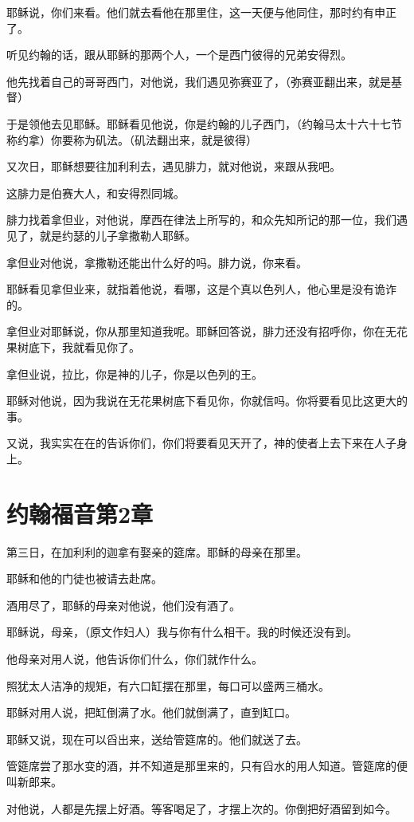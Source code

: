 \documentclass[12pt,oneside]{book}
\begin{document}
耶稣说，你们来看。他们就去看他在那里住，这一天便与他同住，那时约有申正了。

听见约翰的话，跟从耶稣的那两个人，一个是西门彼得的兄弟安得烈。

他先找着自己的哥哥西门，对他说，我们遇见弥赛亚了，（弥赛亚翻出来，就是基督）

于是领他去见耶稣。耶稣看见他说，你是约翰的儿子西门，（约翰马太十六十七节称约拿）你要称为矶法。（矶法翻出来，就是彼得）

又次日，耶稣想要往加利利去，遇见腓力，就对他说，来跟从我吧。

这腓力是伯赛大人，和安得烈同城。

腓力找着拿但业，对他说，摩西在律法上所写的，和众先知所记的那一位，我们遇见了，就是约瑟的儿子拿撒勒人耶稣。

拿但业对他说，拿撒勒还能出什么好的吗。腓力说，你来看。

耶稣看见拿但业来，就指着他说，看哪，这是个真以色列人，他心里是没有诡诈的。

拿但业对耶稣说，你从那里知道我呢。耶稣回答说，腓力还没有招呼你，你在无花果树底下，我就看见你了。

拿但业说，拉比，你是神的儿子，你是以色列的王。

耶稣对他说，因为我说在无花果树底下看见你，你就信吗。你将要看见比这更大的事。

又说，我实实在在的告诉你们，你们将要看见天开了，神的使者上去下来在人子身上。

\chapter{约翰福音第2章}
第三日，在加利利的迦拿有娶亲的筵席。耶稣的母亲在那里。

耶稣和他的门徒也被请去赴席。

酒用尽了，耶稣的母亲对他说，他们没有酒了。

耶稣说，母亲，（原文作妇人）我与你有什么相干。我的时候还没有到。

他母亲对用人说，他告诉你们什么，你们就作什么。

照犹太人洁净的规矩，有六口缸摆在那里，每口可以盛两三桶水。

耶稣对用人说，把缸倒满了水。他们就倒满了，直到缸口。

耶稣又说，现在可以舀出来，送给管筵席的。他们就送了去。

管筵席尝了那水变的酒，并不知道是那里来的，只有舀水的用人知道。管筵席的便叫新郎来。

对他说，人都是先摆上好酒。等客喝足了，才摆上次的。你倒把好酒留到如今。
\end{document}
